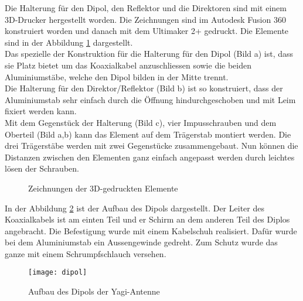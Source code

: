 Die Halterung für den Dipol, den Reflektor und die Direktoren sind mit einem 3D-Drucker hergestellt worden. Die Zeichnungen sind im Autodesk Fusion 360 konstruiert worden und danach mit dem Ultimaker 2+ gedruckt. Die Elemente sind in der Abbildung \ref*{fig:3D-Elemente} dargestellt.\\

Das spezielle der Konstruktion für die Halterung für den Dipol (Bild a) ist, dass sie Platz bietet um das Koaxialkabel anzuschliessen sowie die beiden Aluminiumstäbe, welche den Dipol bilden in der Mitte trennt.\\
Die Halterung für den Direktor/Reflektor (Bild b) ist so konstruiert, dass der Aluminiumstab sehr einfach durch die Öffnung hindurchgeschoben und mit Leim fixiert werden kann. \\
Mit dem Gegenstück der Halterung (Bild c), vier Impusschrauben und dem Oberteil (Bild a,b) kann das Element auf dem Trägerstab montiert werden. Die drei Trägerstäbe werden mit zwei Gegenstücke zusammengebaut. Nun können die Distanzen zwischen den Elementen ganz einfach angepasst werden durch leichtes lösen der Schrauben.

\begin{figure}[H]
	\centering
	\qquad
	\qquad
	\caption{Zeichnungen der 3D-gedruckten Elemente }
	\label{fig:3D-Elemente}
\end{figure}

In der Abbildung \ref*{fig:aufbau_dipol} ist der Aufbau des Dipols dargestellt. Der Leiter des Koaxialkabels ist am einten Teil und er Schirm an dem anderen Teil des Diplos angebracht. Die Befestigung wurde mit einem Kabelschuh realisiert. Dafür wurde bei dem Aluminiumstab ein Aussengewinde gedreht. Zum Schutz wurde das ganze mit einem Schrumpfschlauch versehen.

\begin{figure}[H]
	\centering
	\texttt{[image: dipol]}
	\caption{Aufbau des Dipols der Yagi-Antenne}\label{fig:aufbau_dipol}
\end{figure}





